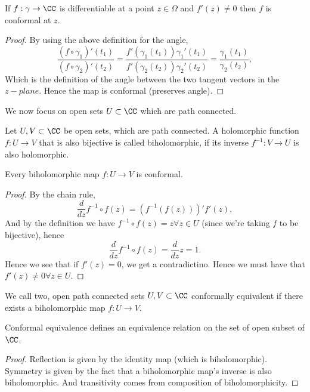 \begin{lemma}
  If $f:\gamma\to\CC$ is differentiable at a point $z\in\Omega$ and $f'(z)\neq
  0$ then $f$ is conformal at $z$.
  \label{<+label+>}
\end{lemma}
\begin{proof}
  By using the above definition for the angle,
  \[\frac{(f\circ \gamma_1)'(t_1)}{(f\circ \gamma_2)'(t_2)} =
  \frac{f'(\gamma_1(t_1))\gamma_1'(t_1)}{f'(\gamma_2(t_2))\gamma_2'(t_2)}=
  \frac{\gamma_1(t_1)}{\gamma_2(t_2)},\]
  Which is the definition of the angle between the two tangent vectors in the
  $z-plane$. Hence the map is conformal (preserves angle).
\end{proof}
We now focus on open sets $U\subset\CC$ which are path connected.
\begin{definition}
  Let $U,V\subset\CC$ be open sets, which are path connected. A holomorphic
  function $f:U\to V$ that is also bijective is called biholomorphic, if its
  inverse $f^{-1}:V\to U$ is also holomorphic.
  \label{def:biholomorphicFun}
\end{definition}
\begin{proposition}
  Every biholomorphic map $f:U\to V$ is conformal.
  \label{<+label+>}
\end{proposition}
\begin{proof}
  By the chain rule,
  \[\frac{d}{dz}f^{-1}\circ f (z) = (f^{-1}(f(z)))' f'(z),\]
  And by the definition we have $f^{-1}\circ f(z) = z \forall z\in U$ (since
  we're taking $f$ to be bijective), hence
  \[\frac{d}{dz}f^{-1}\circ f (z) = \frac{d}{dz} z =1.\]
  Hence we see that if $f'(z)=0$, we get a contradictino. Hence we must have
  that $f'(z)\neq 0 \forall z\in U$. 
\end{proof}
\begin{definition}
  We call two, open path connected sets $U,V\subset\CC$ conformally equivalent
  if there exists a biholomorphic map $f:U\to V$.
  \label{def:conformalEquivalence}
\end{definition}
\begin{proposition}
  Conformal equivalence defines an equivalence relation on the set of open
  subset of $\CC$.
  \label{prop:conformalEqRel}
\end{proposition}
\begin{proof}
  Reflection is given by the identity map (which is biholomorphic). Symmetry is
  given by the fact that a biholomorphic map's inverse is also biholomorphic.
  And transitivity comes from composition of biholomorphicity.
\end{proof}
